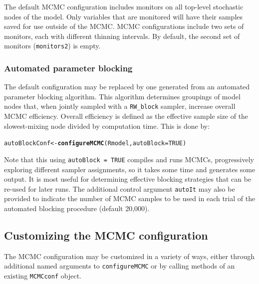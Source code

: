 \documentclass[12pt,oneside]{book}\usepackage[]{graphicx}\usepackage[]{color}
\makeatletter
\newcommand{\hlnum}[1]{\textcolor[rgb]{0.686,0.059,0.569}{#1}}%
\newcommand{\hlstd}[1]{\textcolor[rgb]{0.345,0.345,0.345}{#1}}%
\newcommand{\hlkwb}[1]{\textcolor[rgb]{0.69,0.353,0.396}{#1}}%
\newcommand{\hlkwc}[1]{\textcolor[rgb]{0.333,0.667,0.333}{#1}}%
\newcommand{\hlkwd}[1]{\textcolor[rgb]{0.737,0.353,0.396}{\textbf{#1}}}%
\newenvironment{kframe}{%
 \def\at@end@of@kframe{}%
 \ifinner\ifhmode%
  \def\at@end@of@kframe{\end{minipage}}%
  \begin{minipage}{\columnwidth}%
 \fi\fi%
 \def\FrameCommand##1{\hskip\@totalleftmargin \hskip-\fboxsep
 \colorbox{shadecolor}{##1}\hskip-\fboxsep
     \hskip-\linewidth \hskip-\@totalleftmargin \hskip\columnwidth}%
 \MakeFramed {\advance\hsize-\width
   \@totalleftmargin\z@ \linewidth\hsize
   \@setminipage}}%
 {\par\unskip\endMakeFramed%
 \at@end@of@kframe}
\newenvironment{knitrout}{}{} %
\def\cd#1{\texttt{#1}}
\makeatother
\begin{document}
The default MCMC configuration includes monitors on all top-level stochastic nodes of the model. Only variables that are monitored will have their samples saved for use outside of the MCMC. MCMC configurations include two sets of monitors, each with different thinning intervals.  By default, the second set of monitors (\cd{monitors2}) is empty. 

\subsubsection{Automated parameter blocking}

The default configuration may be replaced by one generated from an automated parameter blocking algorithm.  This algorithm determines groupings of model nodes that, when jointly sampled with a \cd{RW\_block} sampler, increase overall MCMC efficiency.  Overall efficiency is defined as the effective sample size of the slowest-mixing node divided by computation time.  This is done by:

\begin{knitrout}
\color{fgcolor}\begin{kframe}
\begin{alltt}
\hlstd{autoBlockConf} \hlkwb{<-} \hlkwd{configureMCMC}\hlstd{(Rmodel,} \hlkwc{autoBlock} \hlstd{=} \hlnum{TRUE}\hlstd{)}
\end{alltt}
\end{kframe}
\end{knitrout}

Note that this using \cd{autoBlock = TRUE} compiles and runs MCMCs, progressively exploring different sampler assignments, so it takes some time and generates some output.  It is most useful for determining effective blocking strategies that can be re-used for later runs.  The additional control argument \cd{autoIt} may also be provided to indicate the number of MCMC samples to be used in each trial of the automated blocking procedure (default 20,000). 

\subsection{Customizing the MCMC configuration}
\label{sec:customizing-mcmc-conf}

The MCMC configuration may be customized in a variety of ways, either through additional named arguments to \cd{configureMCMC} or by calling methods of an existing \cd{MCMCconf} object.
\end{document}
